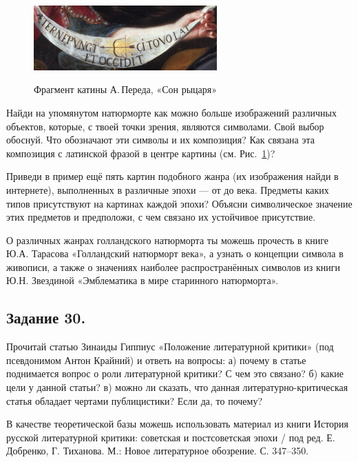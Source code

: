\begin{list}{)}{\leftmargin=6mm  \topsep=0mm  \itemsep=0pt \parsep=0mm \itemindent=-1pt}

\begin{minipage}{0.94\textwidth}    
\setlength{\intextsep}{0.2pt} 
\setlength\columnsep{7.2pt}
\begin{figure}
{\includegraphics[width=7.04cm]{images/image2-19.png}}
\caption{\label{son-kusok}Фрагмент катины А.\,Переда, «Сон рыцаря»}
\end{figure}
\item Найди на упомянутом натюрморте как можно больше изображений различных объектов, которые, с твоей точки зрения, являются символами. Свой выбор обоснуй. Что обозначают эти символы и их композиция? Как связана эта композиция с латинской фразой в центре картины (см. Рис.~\ref{son-kusok})? 

\item Приведи в пример ещё пять картин подобного жанра (их изображения найди в интернете), выполненных в различные эпохи — от  до  века. Предметы каких типов присутствуют на картинах каждой эпохи? Объясни символическое значение этих предметов и предположи, с чем связано их устойчивое присутствие.\end{minipage}
\end{list}\vspace{\parsep}

О различных жанрах голландского натюрморта ты можешь прочесть в книге Ю.А. Тарасова «Голландский натюрморт  века», а узнать о концепции символа в живописи, а также о значениях наиболее распространённых символов из книги Ю.Н. Звездиной «Эмблематика в мире старинного натюрморта».

\subsection*{Задание 30.}
    Прочитай статью Зинаиды Гиппиус «Положение литературной критики» (под псевдонимом Антон Крайний) и ответь на вопросы: а) почему в статье поднимается вопрос о роли литературной критики? С чем это связано? б) какие цели у данной статьи? в) можно ли сказать, что данная литературно-критическая статья обладает чертами публицистики? Если да, то почему?
    
    В качестве теоретической базы можешь использовать материал из книги История русской литературной критики: советская и постсоветская эпохи / под ред. Е. Добренко, Г. Тиханова. М.: Новое литературное обозрение.  С. 347–350. 
